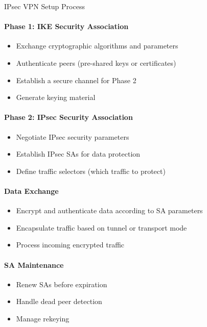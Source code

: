 \begin{KR}{IPsec VPN Setup Process}\\
\paragraph{Phase 1: IKE Security Association}
\begin{itemize}
    \item Exchange cryptographic algorithms and parameters
    \item Authenticate peers (pre-shared keys or certificates)
    \item Establish a secure channel for Phase 2
    \item Generate keying material
\end{itemize}

\paragraph{Phase 2: IPsec Security Association}
\begin{itemize}
    \item Negotiate IPsec security parameters
    \item Establish IPsec SAs for data protection
    \item Define traffic selectors (which traffic to protect)
\end{itemize}

\paragraph{Data Exchange}
\begin{itemize}
    \item Encrypt and authenticate data according to SA parameters
    \item Encapsulate traffic based on tunnel or transport mode
    \item Process incoming encrypted traffic
\end{itemize}

\paragraph{SA Maintenance}
\begin{itemize}
    \item Renew SAs before expiration
    \item Handle dead peer detection
    \item Manage rekeying
\end{itemize}
\end{KR}

